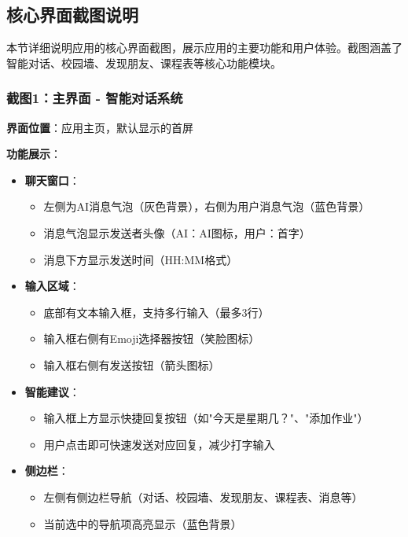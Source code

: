 \documentclass[12pt,a4paper]{article}
\begin{document}
\subsection{核心界面截图说明}

本节详细说明应用的核心界面截图，展示应用的主要功能和用户体验。截图涵盖了智能对话、校园墙、发现朋友、课程表等核心功能模块。

\subsubsection{截图1：主界面 - 智能对话系统}

\textbf{界面位置}：应用主页，默认显示的首屏

\textbf{功能展示}：
\begin{itemize}
    \item \textbf{聊天窗口}：
        \begin{itemize}
            \item 左侧为AI消息气泡（灰色背景），右侧为用户消息气泡（蓝色背景）
            \item 消息气泡显示发送者头像（AI：AI图标，用户：首字）
            \item 消息下方显示发送时间（HH:MM格式）
        \end{itemize}
    \item \textbf{输入区域}：
        \begin{itemize}
            \item 底部有文本输入框，支持多行输入（最多3行）
            \item 输入框右侧有Emoji选择器按钮（笑脸图标）
            \item 输入框右侧有发送按钮（箭头图标）
        \end{itemize}
    \item \textbf{智能建议}：
        \begin{itemize}
            \item 输入框上方显示快捷回复按钮（如"今天是星期几？"、"添加作业"）
            \item 用户点击即可快速发送对应回复，减少打字输入
        \end{itemize}
    \item \textbf{侧边栏}：
        \begin{itemize}
            \item 左侧有侧边栏导航（对话、校园墙、发现朋友、课程表、消息等）
            \item 当前选中的导航项高亮显示（蓝色背景）
        \end{itemize}
\end{itemize}
\end{document}
